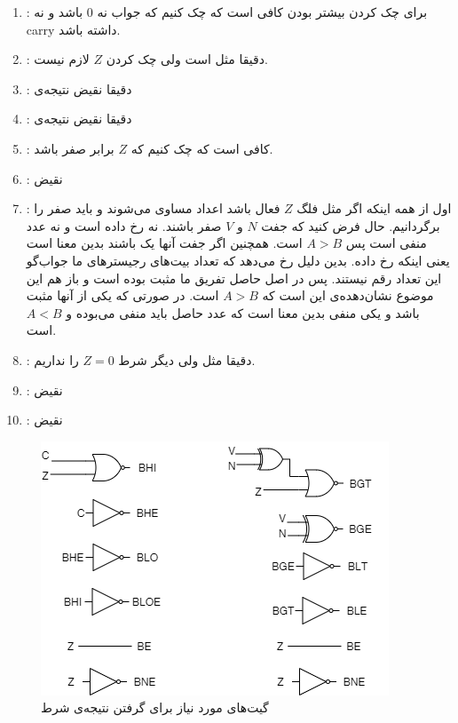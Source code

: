\begin{enumerate}
    \item {}: برای چک کردن بیشتر بودن کافی است که چک کنیم که جواب نه 0 باشد و نه carry داشته باشد.
    \item {}: دقیقا مثل  است ولی چک کردن $Z$ لازم نیست.
    \item {}: دقیقا نقیض نتیجه‌ی 
    \item {}: دقیقا نقیض نتیجه‌ی 
    \item {}: کافی است که چک کنیم که $Z$ برابر صفر باشد.
    \item {}: نقیض 
    \item {}: اول از همه اینکه اگر مثل  فلگ $Z$ فعال باشد اعداد مساوی می‌‌شوند و باید صفر را برگردانیم.
    حال فرض کنید که جفت
    $N$ و $V$
    صفر باشند. نه  رخ داده است و نه عدد منفی است پس $A > B$ است.
    همچنین اگر جفت آنها یک باشند بدین معنا است یعنی اینکه  رخ داده.  بدین دلیل رخ می‌دهد که تعداد بیت‌های رجیستر‌های ما جواب‌گو این تعداد رقم نیستند.
    پس در اصل حاصل تفریق ما مثبت بوده است و باز هم این موضوع نشان‌دهده‌ی این است که $A > B$ است.
    در صورتی که یکی از آنها مثبت باشد و یکی منفی بدین معنا است که عدد حاصل باید منفی می‌بوده و $A < B$ است.
    \item {}: دقیقا مثل  ولی دیگر شرط $Z = 0$ را نداریم.
    \item {}: نقیض 
    \item {}: نقیض 
\end{enumerate}

\begin{figure}[H]
    \centering
    \includegraphics[scale=0.75]{source/1-2.png}
    \caption{گیت‌های مورد نیاز برای گرفتن نتیجه‌ی شرط}
    \label{1-2-circuit}
\end{figure}